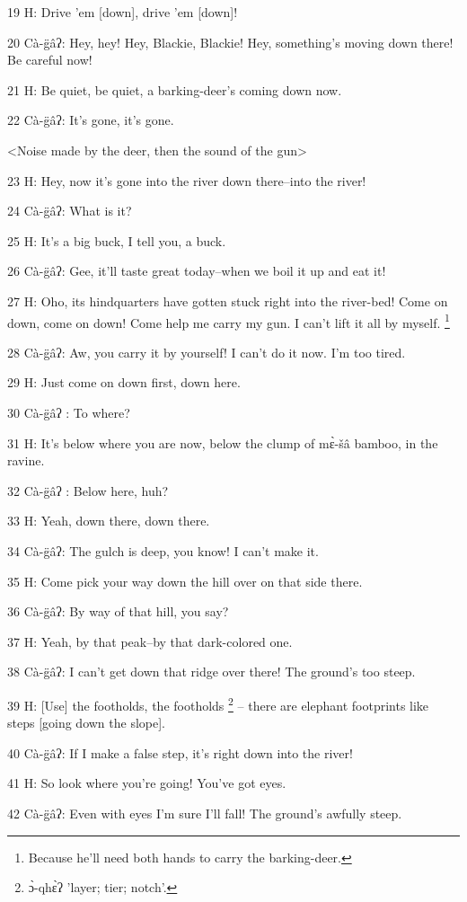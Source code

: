 19 H: Drive 'em [down], drive 'em [down]!

20  Cà-g̈âʔ: Hey, hey! Hey, Blackie, Blackie! Hey, something's moving down
there! Be careful now!

21 H: Be quiet, be quiet, a barking-deer's coming down now.

22  Cà-g̈âʔ: It's gone, it's gone.

<Noise made by the deer, then the sound of the gun>

23 H: Hey, now it's gone into the river down there--into the river!

24  Cà-g̈âʔ: What is it?

25 H: It's a big buck, I tell you, a buck.

26  Cà-g̈âʔ: Gee, it'll taste great today--when we boil it up and eat it!

27 H: Oho, its hindquarters have gotten stuck right into the river-bed! Come on
down, come on down! Come help me carry my gun. I can't lift it all by myself. \footnote{Because he'll need both hands to carry the barking-deer.}

28  Cà-g̈âʔ: Aw, you carry it by yourself! I can't do it now. I'm too tired.

29 H: Just come on down first, down here.

30 Cà-g̈âʔ : To where?

31 H: It's below where you are now, below the clump of mɛ̀-šâ bamboo, in the
ravine.

32 Cà-g̈âʔ : Below here, huh?

33 H: Yeah, down there, down there.

34  Cà-g̈âʔ: The gulch is deep, you know! I can't make it.

35 H: Come pick your way down the hill over on that side there.

36  Cà-g̈âʔ: By way of that hill, you say?

37 H: Yeah, by that peak--by that dark-colored one.

38  Cà-g̈âʔ: I can't get down that ridge over there! The ground's too steep.

39 H: [Use] the footholds, the footholds \footnote{ɔ̀-qhɛ̀ʔ 'layer; tier; notch'.} -- there are elephant footprints like
steps [going down the slope].

40  Cà-g̈âʔ: If I make a false step, it's right down into the river!

41 H: So look where you're going! You've got eyes.

42  Cà-g̈âʔ: Even with eyes I'm sure I'll fall! The ground's awfully steep.

